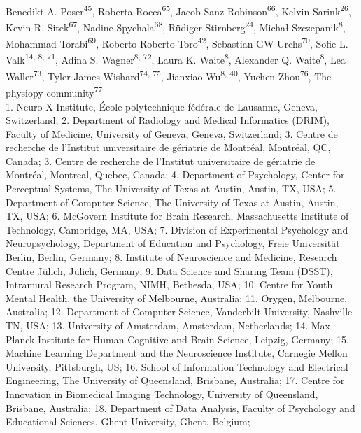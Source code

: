 \documentclass[10pt,a4paper,twocolumns]{proc}
\newcommand{\affiliations}[1]{{\scriptsize #1} \\}
\begin{document}
{Benedikt A. Poser\textsuperscript{45}, %
Roberta Rocca\textsuperscript{65}, %
Jacob Sanz-Robinson\textsuperscript{66}, %
Kelvin Sarink\textsuperscript{26}, %
Kevin R. Sitek\textsuperscript{67}, %
Nadine Spychala\textsuperscript{68}, %
Rüdiger Stirnberg\textsuperscript{24}, %
Michał Szczepanik\textsuperscript{8}, %
Mohammad Torabi\textsuperscript{69}, %
Roberto Roberto Toro\textsuperscript{42}, %
Sebastian GW Urchs\textsuperscript{70}, %
Sofie L. Valk\textsuperscript{14, 8, 71}, %
Adina S. Wagner\textsuperscript{8, 72}, %
Laura K. Waite\textsuperscript{8}, %
Alexander Q. Waite\textsuperscript{8}, %
Lea Waller\textsuperscript{73}, %
Tyler James Wishard\textsuperscript{74, 75}, %
Jianxiao Wu\textsuperscript{8, 40}, %
Yuchen Zhou\textsuperscript{76}, %
The physiopy community\textsuperscript{77} %
}
\\
\affiliations{1. Neuro-X Institute, École polytechnique fédérale de Lausanne, Geneva, Switzerland; %
2. Department of Radiology and Medical Informatics (DRIM), Faculty of Medicine, University of Geneva, Geneva, Switzerland; %
3. Centre de recherche de l'Institut universitaire de gériatrie de Montréal, Montréal, QC, Canada; %
3. Centre de recherche de l'Institut universitaire de gériatrie de Montréal, Montreal, Quebec, Canada; %
4. Department of Psychology, Center for Perceptual Systems, The University of Texas at Austin, Austin, TX, USA; %
5. Department of Computer Science, The University of Texas at Austin, Austin, TX, USA; %
6. McGovern Institute for Brain Research, Massachusetts Institute of Technology, Cambridge, MA, USA; %
7. Division of Experimental Psychology and Neuropsychology, Department of Education and Psychology, Freie Universität Berlin, Berlin, Germany; %
8. Institute of Neuroscience and Medicine, Research Centre Jülich, Jülich, Germany; %
9. Data Science and Sharing Team (DSST), Intramural Research Program, NIMH, Bethesda, USA; %
10. Centre for Youth Mental Health, the University of Melbourne, Australia; %
11. Orygen, Melbourne, Australia; %
12. Department of Computer Science, Vanderbilt University, Nashville TN, USA; %
13. University of Amsterdam, Amsterdam, Netherlands; %
14. Max Planck Institute for Human Cognitive and Brain Science, Leipzig, Germany; %
15. Machine Learning Department and the Neuroscience Institute, Carnegie Mellon University, Pittsburgh, US; %
16. School of Information Technology and Electrical Engineering, The University of Queensland, Brisbane, Australia; %
17. Centre for Innovation in Biomedical Imaging Technology, University of Queensland, Brisbane, Australia; %
18. Department of Data Analysis, Faculty of Psychology and Educational Sciences, Ghent University, Ghent, Belgium; %
}
\end{document}
